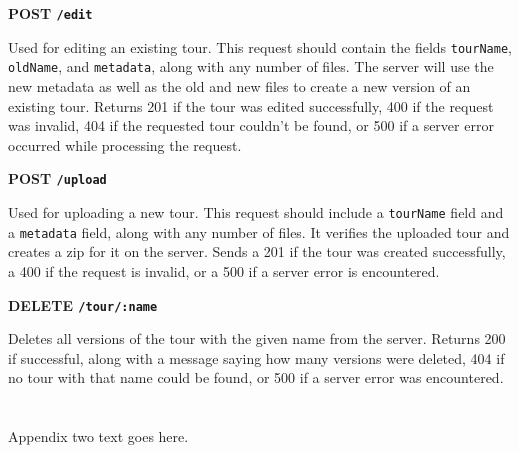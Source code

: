 \documentclass[a4paper, 10pt, american, titlepage]{article}
\newenvironment{indented}[1]%
{\begin{list}{}%
	{\setlength{\leftmargin}{#1}}%
	\item[]%
}
{\end{list}}
\begin{document}
\noindent\textbf{POST \texttt{/edit}}

\begin{indented}{1cm}
	Used for editing an existing tour. This request should contain the fields
	\texttt{tourName}, \texttt{oldName}, and \texttt{metadata}, along with any
	number of files.  The server will use the new metadata as well as the old
	and new files to create a new version of an existing tour. Returns 201 if
	the tour was edited successfully, 400 if the request was invalid, 404 if the
	requested tour couldn't be found, or 500 if a server error occurred while
	processing the request.
\end{indented}

\noindent\textbf{POST \texttt{/upload}}

\begin{indented}{1cm}
	Used for uploading a new tour. This request should include a
	\texttt{tourName} field and a \texttt{metadata} field, along with any number
	of files. It verifies the uploaded tour and creates a zip for it on the
	server. Sends a 201 if the tour was created successfully, a 400 if the
	request is invalid, or a 500 if a server error is encountered.
\end{indented}

\noindent\textbf{DELETE \texttt{/tour/:name}}

\begin{indented}{1cm}
	Deletes all versions of the tour with the given name from the server.
	Returns 200 if successful, along with a message saying how many versions
	were deleted, 404 if no tour with that name could be found, or 500 if a
	server error was encountered.
\end{indented}

\newpage

\section{}

Appendix two text goes here.
\end{document}
